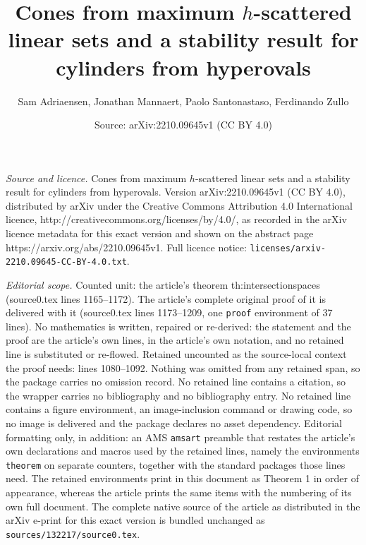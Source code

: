 \documentclass[10pt,a4paper]{amsart}
\title{Cones from maximum $h$-scattered linear sets and a stability result for cylinders from hyperovals}
\author{Sam Adriaensen, Jonathan Mannaert, Paolo Santonastaso, Ferdinando Zullo}
\date{Source: arXiv:2210.09645v1 (CC BY 4.0)}
\begin{document}
\maketitle

\noindent\emph{Source and licence.} Cones from maximum $h$-scattered linear sets and a stability result for cylinders from hyperovals. Version arXiv:2210.09645v1 (CC BY 4.0), distributed by arXiv under the Creative Commons Attribution 4.0 International licence, http://creativecommons.org/licenses/by/4.0/, as recorded in the arXiv licence metadata for this exact version and shown on the abstract page https://arxiv.org/abs/2210.09645v1. Full licence notice: \texttt{licenses/arxiv-2210.09645-CC-BY-4.0.txt}.\par\smallskip

\noindent\textit{Editorial scope.} Counted unit: the article's theorem th:intersectionspaces (source0.tex lines 1165--1172). The article's complete original proof of it is delivered with it (source0.tex lines 1173--1209, one \texttt{proof} environment of 37 lines). No mathematics is written, repaired or re-derived: the statement and the proof are the article's own lines, in the article's own notation, and no retained line is substituted or re-flowed.  Retained uncounted as the source-local context the proof needs: lines 1080--1092.  Nothing was omitted from any retained span, so the package carries no omission record.  No retained line contains a citation, so the wrapper carries no bibliography and no bibliography entry.  No retained line contains a figure environment, an image-inclusion command or drawing code, so no image is delivered and the package declares no asset dependency.  Editorial formatting only, in addition: an AMS \texttt{amsart} preamble that restates the article's own declarations and macros used by the retained lines, namely the environments \texttt{theorem} on separate counters, together with the standard packages those lines need.  The retained environments print in this document as Theorem 1 in order of appearance, whereas the article prints the same items with the numbering of its own full document.  The complete native source of the article as distributed in the arXiv e-print for this exact version is bundled unchanged as \texttt{sources/132217/source0.tex}.
\end{document}
